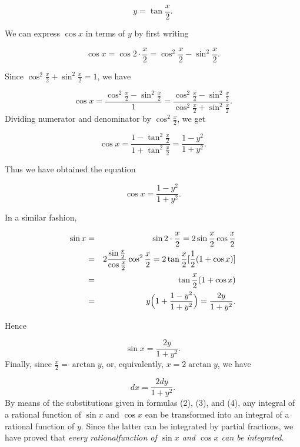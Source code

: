 \begin{equation}
y = \tan \frac{x}{2}. 
\label{eq7.5.1}
\end{equation}

\noindent We can express $\cos x$ in terms of $y$ by first writing

$$
\cos x = \cos 2 \cdot \frac{x}{2} = \cos^{2} \frac{x}{2} - \sin^{2} \frac{x}{2}.
$$

\noindent Since $\cos^{2} \frac{x}{2} + \sin^{2} \frac{x}{2} = 1$, we have

$$
\cos x = \frac{\cos^2 \frac{x}{2} - \sin^{2} \frac{x}{2}}{1} 
= \frac{\cos^{2} \frac{x}{2} - \sin^{2} \frac{x}{2}}{\cos^{2} \frac{x}{2} + \sin^{2} \frac{x}{2}}.
$$
\noindent Dividing numerator and denominator by $\cos^{2} \frac{x}{2}$,
we get  

$$
\cos x = \frac{1 - \tan^{2} \frac{x}{2}}{1 + \tan^{2} \frac{x}{2}}
= \frac{1 - y^2}{1 + y^2}. 
$$

\noindent Thus we have obtained the equation


\begin{equation}
\cos x= \frac{1- y^2}{1 + y^2}. 
\label{eq7.5.2}
\end{equation}

\noindent In a similar fashion, 

\begin{eqnarray*}
\sin x &=& \sin 2 \cdot \frac{x}{ 2} = 2 \sin \frac{x}{2} \cos \frac{x}{2}\\
&=& 2 \frac{\sin\frac{x}{2}}{\cos\frac{x}{2}} \cos^{2} \frac{x}{2}  
= 2 \tan \frac{x}{2} [\frac{1}{2}(1 + \cos x)]  \\
&=& \tan \frac{x}{2} (1 + \cos x)\\
&=& y \Bigl(1 + \frac{1 - y^2}{1 + y^2} \Bigr) = \frac{2y}{1 + y^2}.
\end{eqnarray*}

\noindent Hence

\begin{equation}
\sin x =\frac{2y}{1 + y^2}. 
\label{eq7.5.3}
\end{equation}
\noindent Finally, since $\frac{x}{2} = \arctan y$, or, equivalently, $x = 2 \arctan y$, we have 

\begin{equation}
dx = \frac{2 dy}{1 + y^2}.
\label{eq7.5.4}
\end{equation}
\noindent By means of the substitutions given in formulas (2), (3), and (4), any integral of a rational function of $\sin x$ and $\cos x$ ean be transformed into an integral of a rational function of $y$. Since the latter can be integrated by partial fractions, we have proved that \textit{every rationalfunction of $\sin x$ and $\cos x$ can be integrated.}

